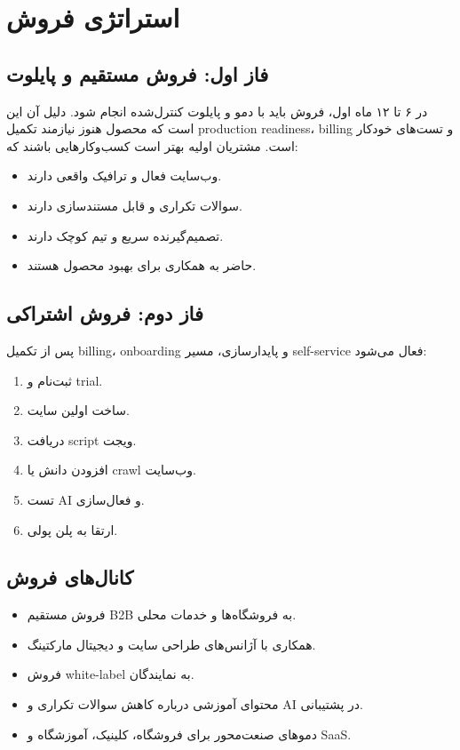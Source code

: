 \documentclass[12pt,a4paper]{article}
\begin{document}
\section{استراتژی فروش}
\subsection{فاز اول: فروش مستقیم و پایلوت}
در ۶ تا ۱۲ ماه اول، فروش باید با دمو و پایلوت کنترل‌شده انجام شود. دلیل آن این است که محصول هنوز نیازمند تکمیل production readiness، billing و تست‌های خودکار است. مشتریان اولیه بهتر است کسب‌وکارهایی باشند که:
\begin{itemize}
  \item وب‌سایت فعال و ترافیک واقعی دارند.
  \item سوالات تکراری و قابل مستندسازی دارند.
  \item تصمیم‌گیرنده سریع و تیم کوچک دارند.
  \item حاضر به همکاری برای بهبود محصول هستند.
\end{itemize}

\subsection{فاز دوم: فروش اشتراکی}
پس از تکمیل billing، onboarding و پایدارسازی، مسیر self-service فعال می‌شود:
\begin{enumerate}
  \item ثبت‌نام و trial.
  \item ساخت اولین سایت.
  \item دریافت script ویجت.
  \item افزودن دانش یا crawl وب‌سایت.
  \item تست AI و فعال‌سازی.
  \item ارتقا به پلن پولی.
\end{enumerate}

\subsection{کانال‌های فروش}
\begin{itemize}
  \item فروش مستقیم B2B به فروشگاه‌ها و خدمات محلی.
  \item همکاری با آژانس‌های طراحی سایت و دیجیتال مارکتینگ.
  \item فروش white-label به نمایندگان.
  \item محتوای آموزشی درباره کاهش سوالات تکراری و AI در پشتیبانی.
  \item دموهای صنعت‌محور برای فروشگاه، کلینیک، آموزشگاه و SaaS.
\end{itemize}
\end{document}
